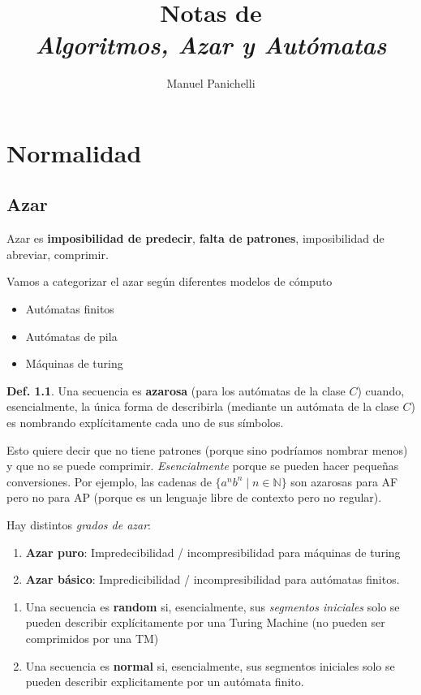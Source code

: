 \documentclass{report}
\author{Manuel Panichelli}
\title{Notas de \\\textit{Algoritmos, Azar y Autómatas}}
\theoremstyle{definition} %
\newtheorem{definition}{Def.}[chapter]
\begin{document}
\maketitle

\chapter{Normalidad}

\section{Azar}

Azar es \textbf{imposibilidad de predecir}, \textbf{falta de patrones},
imposibilidad de abreviar, comprimir.

Vamos a categorizar el azar según diferentes modelos de cómputo

\begin{itemize}
    \item Autómatas finitos
    \item Autómatas de pila
    \item Máquinas de turing
\end{itemize}

\begin{definition}
    Una secuencia es \textbf{azarosa} (para los autómatas de la clase $C$)
    cuando, esencialmente, la única forma de describirla (mediante un autómata
    de la clase $C$) es nombrando explícitamente cada uno de sus símbolos.
\end{definition}

Esto quiere decir que no tiene patrones (porque sino podríamos nombrar menos) y
que no se puede comprimir. \textit{Esencialmente} porque se pueden hacer
pequeñas conversiones. Por ejemplo, las cadenas de $\{a^n b^n \mid n \in
\mathbb{N}\}$ son azarosas para AF pero no para AP (porque es un lenguaje libre
de contexto pero no regular).

Hay distintos \textit{grados de azar}:

\begin{enumerate}
    \item \textbf{Azar puro}: Impredecibilidad / incompresibilidad para
    máquinas de turing
    \item \textbf{Azar básico}: Impredicibilidad / incompresibilidad para
    autómatas finitos.
\end{enumerate}

\begin{enumerate}
    \item Una secuencia es \textbf{random} si, esencialmente, sus
    \textit{segmentos iniciales} solo se pueden describir explícitamente por una
    Turing Machine (no pueden ser comprimidos por una TM)
    \item Una secuencia es \textbf{normal} si, esencialmente, sus segmentos
    iniciales solo se pueden describir explicitamente por un autómata finito.
\end{enumerate}
\end{document}

